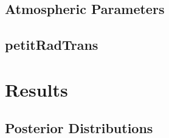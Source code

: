 \subsection{Atmospheric Parameters}
\cite{Madhusudhan2012}%
\cite{Moses2012}%
\cite{Garland2019} %
\cite{Bowler2016} %
\cite{Fegley1994} %
\cite{Tokunaga1983} %
\subsection{petitRadTrans}
\section{Results}
\subsection{Posterior Distributions}